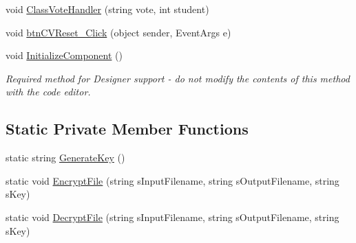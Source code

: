 \begin{DoxyCompactItemize}
void \hyperlink{class_sr_p___classroom_inq_1_1frm_classrrom_inq_ae1f8913d324d1be6740be0d839b3fbf2}{\-Class\-Vote\-Handler} (string vote, int student)
\item 
void \hyperlink{class_sr_p___classroom_inq_1_1frm_classrrom_inq_a029901904e102f3d9168a7779e43ec48}{btn\-C\-V\-Reset\-\_\-\-Click} (object sender, \-Event\-Args e)
\item 
void \hyperlink{class_sr_p___classroom_inq_1_1frm_classrrom_inq_a35e5cf3f9f2a335041a9f3810bb11ae2}{\-Initialize\-Component} ()
\begin{DoxyCompactList}\small\item\em \-Required method for \-Designer support -\/ do not modify the contents of this method with the code editor. \end{DoxyCompactList}\end{DoxyCompactItemize}
\subsection*{\-Static \-Private \-Member \-Functions}
\begin{DoxyCompactItemize}
\item 
static string \hyperlink{class_sr_p___classroom_inq_1_1frm_classrrom_inq_a08e314c225eb3c62963d0f268c656163}{\-Generate\-Key} ()
\item 
static void \hyperlink{class_sr_p___classroom_inq_1_1frm_classrrom_inq_a50670d50ceb8042c197d27b2ce179f36}{\-Encrypt\-File} (string s\-Input\-Filename, string s\-Output\-Filename, string s\-Key)
\item 
static void \hyperlink{class_sr_p___classroom_inq_1_1frm_classrrom_inq_a0655d5baf561da80816166c61c6605af}{\-Decrypt\-File} (string s\-Input\-Filename, string s\-Output\-Filename, string s\-Key)
\end{DoxyCompactItemize}
